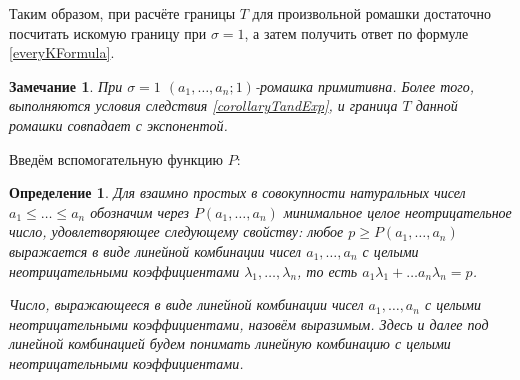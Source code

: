 \documentclass[12pt]{article}
\newtheorem{definition}[theorem]{Определение}
\newtheorem{remark}[theorem]{Замечание}
\begin{document}
Таким образом, при расчёте границы $T$ для произвольной ромашки достаточно посчитать искомую границу при $\sigma = 1$, а затем получить ответ по формуле \ref{everyKFormula}. 

\begin{remark}
\label{rmrk:expAndT}
При $\sigma = 1$ $(a_1, \dots, a_n; 1)$-ромашка примитивна. Более того, выполняются условия следствия \ref{corollaryTandExp}, и граница $T$ данной ромашки совпадает с экспонентой.
\end{remark}

Введём вспомогательную функцию $P$:
\begin{definition}
Для взаимно простых в совокупности натуральных чисел $a_1 \le \dots \le a_n$ обозначим через $P(a_1, \dots, a_n)$ минимальное целое неотрицательное число, удовлетворяющее следующему свойству: любое $p \ge P(a_1, \dots, a_n)$ выражается в виде линейной комбинации чисел $a_1, \dots, a_n$ с целыми неотрицательными коэффициентами $\lambda_1, \dots, \lambda_n$, то есть $a_1 \lambda_1 + \dots a_n \lambda_n = p$.

Число, выражающееся в виде линейной комбинации чисел $a_1, \dots, a_n$ с целыми неотрицательными коэффициентами, назовём выразимым. Здесь и далее под линейной комбинацией будем понимать линейную комбинацию с целыми неотрицательными коэффициентами.
\end{definition}
\end{document}
